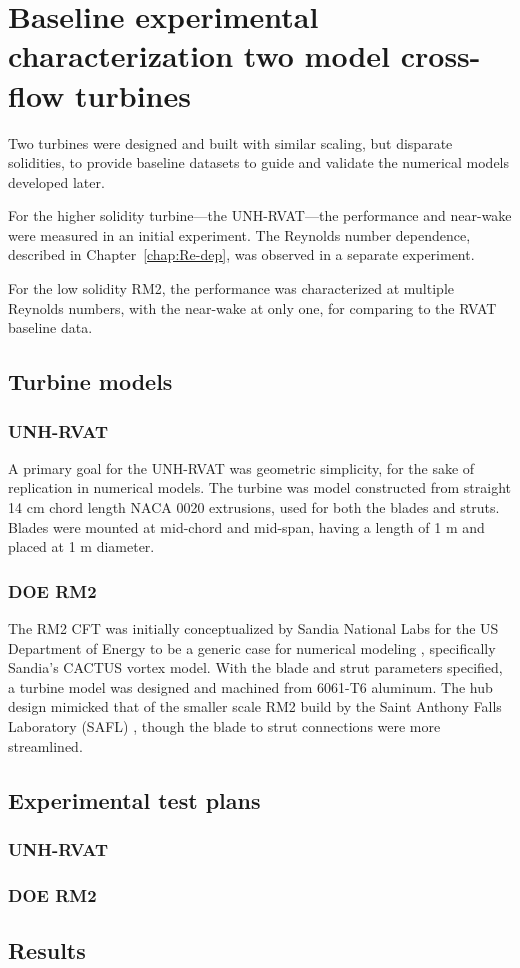 \chapter{Baseline experimental characterization two model cross-flow turbines}

Two turbines were designed and built with similar scaling, but disparate
solidities, to provide baseline datasets to guide and validate the numerical
models developed later.

For the higher solidity turbine---the UNH-RVAT---the performance and near-wake
were measured in an initial experiment. The Reynolds number dependence,
described in Chapter~\ref{chap:Re-dep}, was observed in a separate experiment.

For the low solidity RM2, the performance was characterized at multiple Reynolds
numbers, with the near-wake at only one, for comparing to the RVAT baseline
data.

\section{Turbine models}

\subsection{UNH-RVAT}

A primary goal for the UNH-RVAT was geometric simplicity, for the sake of
replication in numerical models. The turbine was model constructed from straight
14 cm chord length NACA 0020 extrusions, used for both the blades and struts.
Blades were mounted at mid-chord and mid-span, having a length of 1 m and placed
at 1 m diameter.

\subsection{DOE RM2}

The RM2 CFT was initially conceptualized by Sandia National Labs for the US
Department of Energy to be a generic case for numerical modeling
\cite{Barone2011}, specifically Sandia's CACTUS vortex model. With the blade and
strut parameters specified, a turbine model was designed and machined from
6061-T6 aluminum. The hub design mimicked that of the smaller scale RM2 build by
the Saint Anthony Falls Laboratory (SAFL) \cite{Hill2014}, though the blade to
strut connections were more streamlined.

\section{Experimental test plans}

\subsection{UNH-RVAT}

\subsection{DOE RM2}


\section{Results}